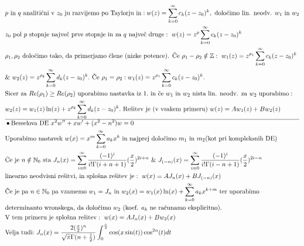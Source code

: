 \documentclass[a4paper, 8pt]{article}
\newcommand{\mth}[1]{\ensuremath{\mathbb{#1}}}
\newcommand{\Z}{\mth{Z}}
\newcommand{\No}{\mth{N}_0}
\begin{document}
\begin{align*}
		&\text{$p$ in $q$ analitični v $z_0$ ju razvijemo po Taylorju in}: w(z)= \sum_{k = 0}^{\infty}c_k(z-z_0)^k,~\text{določimo lin. neodv. $w_1$ in $w_2$} \\
		&\text{$z_0$ pol $p$ stopnje največ prve stopnje in za $q$ največ druge}:~ w(z)= z^\rho\sum_{k = 0}^{\infty}c_k(z-z_0)^k \\
		&\text{$\rho_1, \rho_2$ določimo tako, da primerjamo člene (nizke potence). Če $\rho_1 - \rho_2 \notin \Z$}:~ w_1(z)= z^{\rho_1}\sum_{k = 0}^{\infty}c_k(z-z_0)^k \\
		&\&~w_2(z)= z^{\rho_2}\sum_{k = 0}^{\infty}d_k(z-z_0)^k.~\text{Če $\rho_1 = \rho_2$}: w_1(z)= z^{\rho_1}\sum_{k = 0}^{\infty}c_k(z-z_0)^k. \\
		&\text{Sicer za}~Re(\rho_1)\geq Re(\rho_2)~\text{uporabimo nastavka iz $1.$ in če $w_1$ in $w_2$ nista lin. neodv. za $w_2$ uporabimo}: \\
		&w_2(z) = w_1(z)\ln(z) + z^{\rho_2}\sum_{k = 0}^{\infty}d_k(z-z_0)^k. ~\text{Rešitev je (v vsakem primeru)}~ w(z)=Aw_1(z) + Bw_2(z) \\ \hline
		&\bullet\text{Besselova DE}~ x^2w'' + xw' + (x^2 - n^2)w = 0 \\
		&\text{Uporabimo nastavek}~ w(x)= x^m\sum_{k = 0}^{\infty}a_kx^k ~\text{in najprej določimo $m_1$ in $m_2$(kot pri kompleksnih DE)} \\
		&\text{Če je $n\notin\No$ sta}~ J_n(x)=\sum_{i = 0}^{\infty}\frac{(-1)^i}{i!\Gamma(i+n+1)}(\frac{x}{2})^{2i+n}~\&~J_{(-n)}(x)=\sum_{i = 0}^{\infty}\frac{(-1)^i}{i!\Gamma(i-n+1)}(\frac{x}{2})^{2i-n}\\
		&\text{linearno neodvisni rešitvi, in splošna rešitev je}:~ w(x) = AJ_n(x) + BJ_{(-n)}(x)\\
		&\text{Če je pa $n\in\No$ pa vzamemo $w_1 =J_n$ in}~ w_2(x) = w_1(x)\ln(x) + \sum_{k = 0}^{\infty}a_kx^{k+m}~\text{ter uporabimo} \\
		&\text{determinanto wronskega, da določimo $w_2$ (koef. $a_k$ ne računamo eksplicitno)}. \\
		&\text{V tem primeru je splošna rešitev}:~ w(x)= AJ_n(x) + Bw_2(x) \\
		&\text{Velja tudi:}~ J_n(x) = \frac{2(\frac{x}{2})^n}{\sqrt{\pi}\Gamma(n+\frac{1}{2})}\int_{0}^{\frac{\pi}{2}}\cos(x\sin(t))\cos^{2n}(t)dt
	\end{align*}
\end{document}
